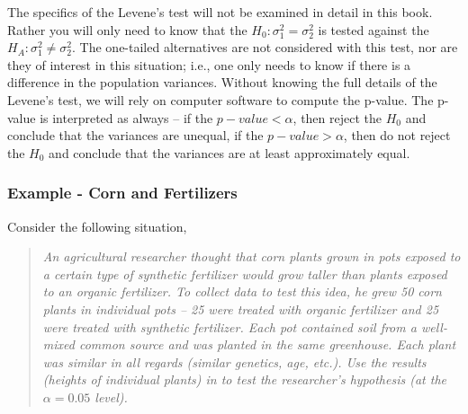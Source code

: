 \documentclass[10pt,openany]{book}\usepackage[]{graphicx}\usepackage[]{color}
\begin{document}

The specifics of the Levene's test will not be examined in detail in this book.  Rather you will only need to know that the $H_{0}:\sigma_{1}^{2}=\sigma_{2}^{2}$ is tested against the $H_{A}:\sigma_{1}^{2}\neq\sigma_{2}^{2}$.  The one-tailed alternatives are not considered with this test, nor are they of interest in this situation; i.e., one only needs to know if there is a difference in the population variances.  Without knowing the full details of the Levene's test, we will rely on computer software to compute the p-value.  The p-value is interpreted as always -- if the $p-value<\alpha$, then reject the $H_{0}$ and conclude that the variances are unequal, if the $p-value>\alpha$, then do not reject the $H_{0}$ and conclude that the variances are at least approximately equal.


\vspace{-12pt}

\subsubsection{Example - Corn and Fertilizers}
Consider the following situation,
\begin{quote}
\textsl{An agricultural researcher thought that corn plants grown in pots exposed to a certain type of synthetic fertilizer would grow taller than plants exposed to an organic fertilizer.  To collect data to test this idea, he grew 50 corn plants in individual pots -- 25 were treated with organic fertilizer and 25 were treated with synthetic fertilizer.  Each pot contained soil from a well-mixed common source and was planted in the same greenhouse.  Each plant was similar in all regards (similar genetics, age, etc.).  Use the results (heights of individual plants) in  to test the researcher's hypothesis (at the $\alpha=0.05$ level).}
\end{quote}
\end{document}
